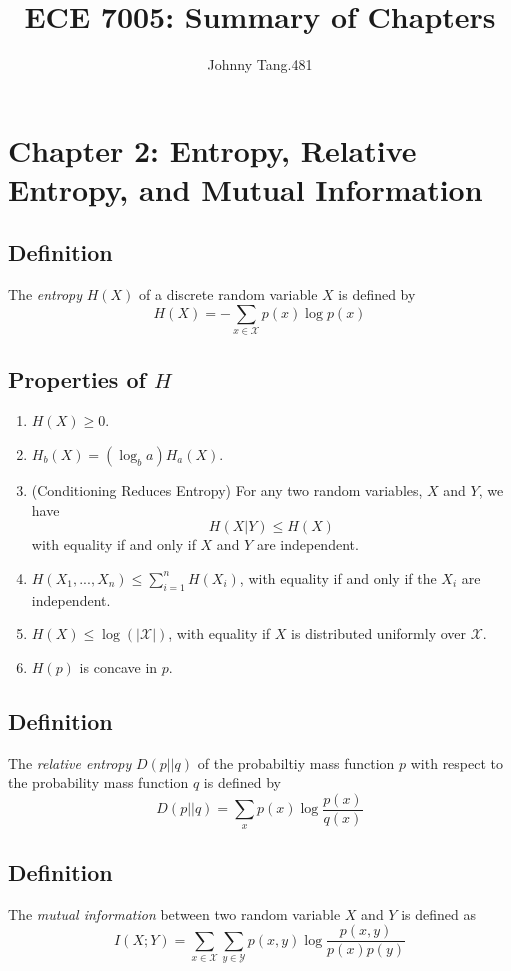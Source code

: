 \documentclass{article}
\title{ECE 7005: Summary of Chapters}
\author{Johnny Tang.481}
\begin{document}
\section*{Chapter 2: Entropy, Relative Entropy, and Mutual Information}
\subsection*{Definition} The \textit{entropy} $H(X)$ of a discrete random variable $X$ is defined by
\begin{equation}
H(X) = -\sum_{x\in \mathcal{X}}p(x)\log p(x)
\end{equation}
\subsection*{Properties of $H$}
\begin{enumerate}
\item $H(X)\geq 0$.
\item $H_b(X)=(\log_ba) H_a(X)$.
\item (Conditioning Reduces Entropy) For any two random variables, $X$ and $Y$, we have \begin{equation}
H(X|Y)\leq H(X)
\end{equation} with equality if and only if $X$ and $Y$ are independent.
\item $H(X_1,...,X_n)\leq \sum_{i=1}^{n} H(X_i)$, with equality if and only if the $X_i$ are independent.
\item $H(X)\leq \log (|\mathcal{X}|)$, with equality if $X$ is distributed uniformly over $\mathcal{X}$.
\item $H(p)$ is concave in $p$.
\end{enumerate}
\subsection*{Definition}
The \textit{relative entropy} $D(p||q)$ of the probabiltiy mass function $p$ with respect to the probability mass function $q$ is defined by \begin{equation}
D(p||q)=\sum_xp(x)\log \frac{p(x)}{q(x)}
\end{equation}
\subsection*{Definition}
The \textit{mutual information} between two random variable $X$ and $Y$ is defined as \begin{equation}
I(X;Y)=\sum_{x\in \mathcal{X}} \sum_{y\in \mathcal{Y}} p(x,y)\log \frac{p(x,y)}{p(x)p(y)}
\end{equation}
\end{document}
